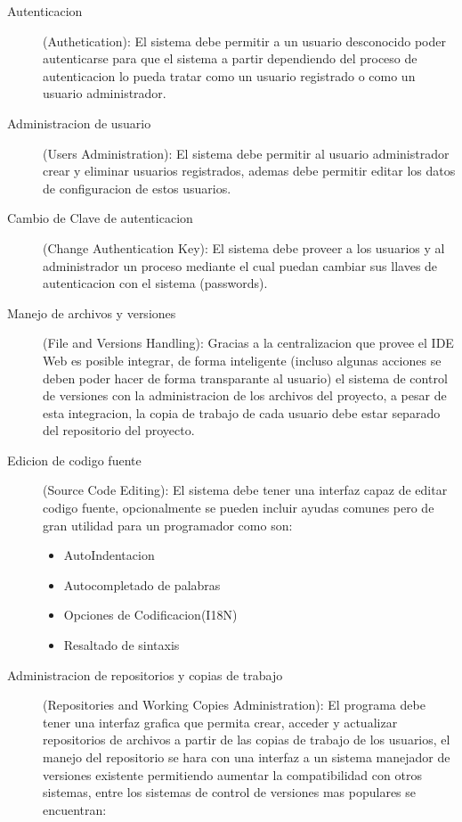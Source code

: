 \begin{description}
	
	\item [Autenticacion] (Authetication): \newline
	El sistema debe permitir a un usuario desconocido poder autenticarse para que el sistema a partir dependiendo del proceso de autenticacion lo pueda tratar como un usuario registrado o como un usuario administrador.
	
	\item [Administracion de usuario] (Users Administration): \newline
	El sistema debe permitir al usuario administrador crear y eliminar usuarios registrados, ademas debe permitir editar los datos de configuracion de estos usuarios.
	
	\item [Cambio de Clave de autenticacion] (Change Authentication Key): \newline
	El sistema debe proveer a los usuarios y al administrador un proceso mediante el cual puedan cambiar sus llaves de autenticacion con el sistema (passwords).
	
	\item [Manejo de archivos y versiones] (File and Versions Handling): \newline
	Gracias a la centralizacion que provee el IDE Web es posible integrar, de forma inteligente (incluso algunas acciones se deben poder hacer de forma transparante al usuario) el sistema de control de versiones con la administracion de los archivos del proyecto, a pesar de esta integracion, la copia de trabajo de cada usuario debe estar separado del repositorio del proyecto.
	
	\item [Edicion de codigo fuente] (Source Code Editing): \newline
	El sistema debe tener una interfaz capaz de editar codigo fuente, opcionalmente se pueden incluir ayudas comunes pero de gran utilidad para un programador como son:
	\begin{itemize}
		\item AutoIndentacion
		\item Autocompletado de palabras
		\item Opciones de Codificacion(I18N)
		\item Resaltado de sintaxis
	\end{itemize}
	
	\item [Administracion de repositorios y copias de trabajo] (Repositories and Working Copies Administration): \newline
	El programa debe tener una interfaz grafica que permita crear, acceder y actualizar repositorios de archivos a partir de las copias de trabajo de los usuarios, el manejo del repositorio se hara con una interfaz a un sistema manejador de versiones existente permitiendo aumentar la compatibilidad con otros sistemas, entre los sistemas de control de versiones mas populares se encuentran:
	

\end{description}
